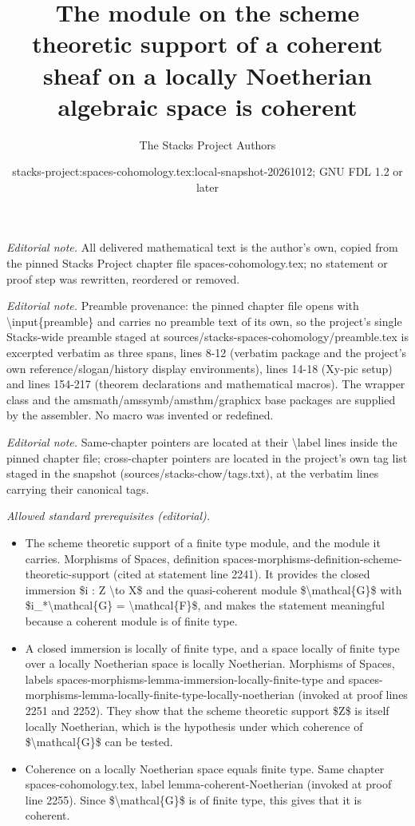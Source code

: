\documentclass[10pt,a4paper]{amsart}
\title{The module on the scheme theoretic support of a coherent sheaf on a locally Noetherian algebraic space is coherent}
\author{The Stacks Project Authors}
\date{stacks-project:spaces-cohomology.tex:local-snapshot-20261012; GNU FDL 1.2 or later}
\theoremstyle{plain}
\theoremstyle{definition}
\theoremstyle{remark}
\numberwithin{equation}{subsection}
\begin{document}
\maketitle
\noindent\textit{Editorial note.} All delivered mathematical text is the author's own, copied from the pinned Stacks Project chapter file spaces-cohomology.tex; no statement or proof step was rewritten, reordered or removed.\par\medskip
\noindent\textit{Editorial note.} Preamble provenance: the pinned chapter file opens with \textbackslash{}input\{preamble\} and carries no preamble text of its own, so the project's single Stacks-wide preamble staged at sources/stacks-spaces-cohomology/preamble.tex is excerpted verbatim as three spans, lines 8-12 (verbatim package and the project's own reference/slogan/history display environments), lines 14-18 (Xy-pic setup) and lines 154-217 (theorem declarations and mathematical macros). The wrapper class and the amsmath/amssymb/amsthm/graphicx base packages are supplied by the assembler. No macro was invented or redefined.\par\medskip
\noindent\textit{Editorial note.} Same-chapter pointers are located at their \textbackslash{}label lines inside the pinned chapter file; cross-chapter pointers are located in the project's own tag list staged in the snapshot (sources/stacks-chow/tags.txt), at the verbatim lines carrying their canonical tags.\par\medskip
\noindent\textit{Allowed standard prerequisites (editorial).}\begin{itemize}
\item The scheme theoretic support of a finite type module, and the module it carries. Morphisms of Spaces, definition spaces-morphisms-definition-scheme-theoretic-support (cited at statement line 2241). It provides the closed immersion \$i : Z \textbackslash{}to X\$ and the quasi-coherent module \$\textbackslash{}mathcal\{G\}\$ with \$i\_*\textbackslash{}mathcal\{G\} = \textbackslash{}mathcal\{F\}\$, and makes the statement meaningful because a coherent module is of finite type.
\item A closed immersion is locally of finite type, and a space locally of finite type over a locally Noetherian space is locally Noetherian. Morphisms of Spaces, labels spaces-morphisms-lemma-immersion-locally-finite-type and spaces-morphisms-lemma-locally-finite-type-locally-noetherian (invoked at proof lines 2251 and 2252). They show that the scheme theoretic support \$Z\$ is itself locally Noetherian, which is the hypothesis under which coherence of \$\textbackslash{}mathcal\{G\}\$ can be tested.
\item Coherence on a locally Noetherian space equals finite type. Same chapter spaces-cohomology.tex, label lemma-coherent-Noetherian (invoked at proof line 2255). Since \$\textbackslash{}mathcal\{G\}\$ is of finite type, this gives that it is coherent.
\end{itemize}\medskip
\end{document}
